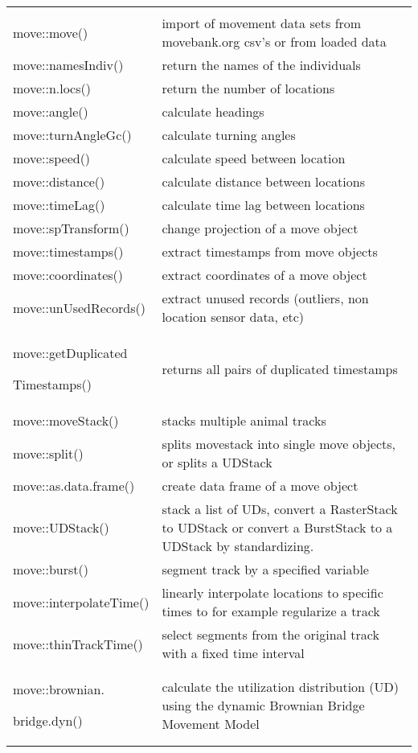 \documentclass[a4paper,10pt,landscape]{article}
\begin{document}
\begin{multicols}{3}
\begin{tabular}{@{}p{\the\MyLen}%
                @{}p{\linewidth-\the\MyLen}@{}}
                & \\
move::move() & import of movement data sets from movebank.org csv's or from loaded data \\
move::namesIndiv() & return the names of the individuals \\
move::n.locs() & return the number of locations \\
move::angle() &  calculate headings\\
move::turnAngleGc() & calculate turning angles \\
move::speed() & calculate speed between location \\  
move::distance() & calculate distance between locations \\
move::timeLag() & calculate time lag between locations \\
move::spTransform() & change projection of a move object \\
move::timestamps() & extract timestamps from move objects \\
move::coordinates() & extract coordinates of a move object \\
move::unUsedRecords() & extract unused records (outliers, non location sensor data, etc) \\
move::getDuplicated\par
Timestamps() & returns all pairs of duplicated timestamps \\
move::moveStack() & stacks multiple animal tracks \\
move::split() & splits movestack into single move objects, or splits a UDStack \\
move::as.data.frame() & create data frame of a move object \\
move::UDStack() & stack a list of UDs, convert a RasterStack to UDStack or convert a BurstStack to a UDStack by standardizing. \\
move::burst() & segment track by a specified variable \\
move::interpolateTime() & linearly interpolate locations to specific times to for example regularize a track \\
move::thinTrackTime() & select segments from the original track with a fixed time interval \\
move::brownian.\par
bridge.dyn() & calculate the utilization distribution (UD) using the dynamic Brownian Bridge Movement Model \\

\end{tabular}
\end{multicols}
\end{document}
